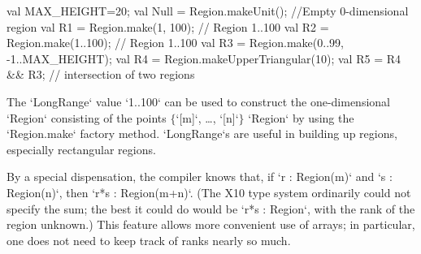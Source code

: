 \begin{ex}
\begin{xten}
val MAX_HEIGHT=20;
val Null = Region.makeUnit(); //Empty 0-dimensional region
val R1 = Region.make(1, 100); // Region 1..100
val R2 = Region.make(1..100);  // Region 1..100
val R3 = Region.make(0..99, -1..MAX_HEIGHT);
val R4 = Region.makeUpperTriangular(10);
val R5 = R4 && R3; // intersection of two regions
\end{xten}

The \xcd`LongRange` value \xcd`1..100` can be used to construct
the one-dimensional \xcd`Region` consisting of the points
$\{$\xcdmath`[m]`, \dots, \xcdmath`[n]`$\}$
\xcd`Region` by using the \xcd`Region.make` factory method.  
\xcd`LongRange`s are useful in building up regions, especially rectangular regions.  
\end{ex}

By a special dispensation, the compiler knows that, if \xcd`r : Region(m)` and
\xcd`s : Region(n)`, then \xcd`r*s : Region(m+n)`.  (The X10 type system
ordinarily could not specify the sum; the best it could do 
would be \xcd`r*s : Region`, with the rank of the region unknown.)  This
feature allows more convenient use of arrays; in particular, one does not need
to keep track of ranks nearly so much.


